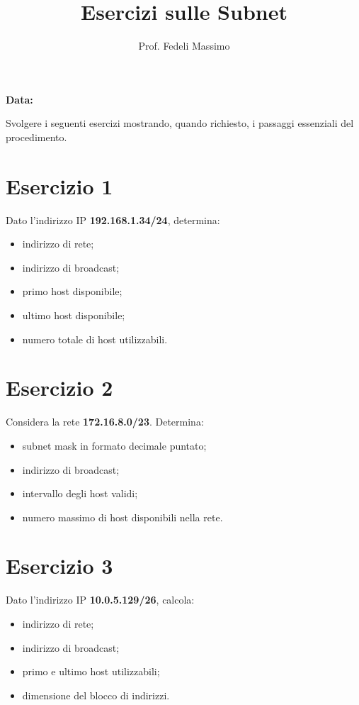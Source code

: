 \documentclass[a4paper,12pt]{article}
\title{Esercizi sulle Subnet}
\author{Prof. Fedeli Massimo}
\date{}
\begin{document}
\maketitle

\textbf{Data:} \underline{\hspace{3cm}}

\vspace{0.5cm}

Svolgere i seguenti esercizi mostrando, quando richiesto, i passaggi essenziali del procedimento.

\section*{Esercizio 1}
Dato l'indirizzo IP \textbf{192.168.1.34/24}, determina:
\begin{itemize}
    \item indirizzo di rete;
    \item indirizzo di broadcast;
    \item primo host disponibile;
    \item ultimo host disponibile;
    \item numero totale di host utilizzabili.
\end{itemize}

\section*{Esercizio 2}
Considera la rete \textbf{172.16.8.0/23}. Determina:
\begin{itemize}
    \item subnet mask in formato decimale puntato;
    \item indirizzo di broadcast;
    \item intervallo degli host validi;
    \item numero massimo di host disponibili nella rete.
\end{itemize}

\section*{Esercizio 3}
Dato l'indirizzo IP \textbf{10.0.5.129/26}, calcola:
\begin{itemize}
    \item indirizzo di rete;
    \item indirizzo di broadcast;
    \item primo e ultimo host utilizzabili;
    \item dimensione del blocco di indirizzi.
\end{itemize}
\end{document}
